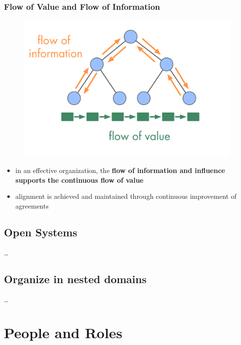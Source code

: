 \subsection{Flow of Value and Flow of Information}
\label{flowofvalueandflowofinformation}

\begin{figure}[htbp]
\centering
\includegraphics[keepaspectratio,width=\textwidth,height=0.75\textheight]{img/workflow-and-value/types-of-flow.png}
\end{figure}

\begin{itemize}
\item in an effective organization, the \textbf{flow of information and influence supports the continuous flow of value}

\item alignment is achieved and maintained through continuous improvement of agreements

\end{itemize}

\section{Open Systems}
\label{opensystems}

{\ldots}

\section{Organize in nested domains}
\label{organizeinnesteddomains}

{\ldots}

\chapter{People and Roles}
\label{peopleandroles}

